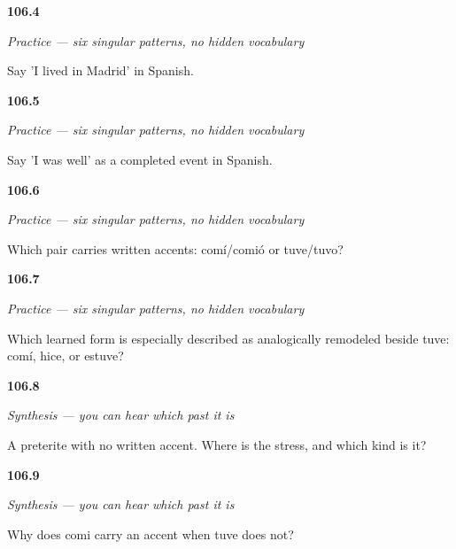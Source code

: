 \noindent\begin{minipage}[t]{\linewidth}
\raggedright
\hypertarget{review-ES-C15-practice-vivi-madrid}{\textbf{106.4}} \emph{Practice — six singular patterns, no hidden vocabulary}\par
\small Say 'I lived in Madrid' in Spanish.
\end{minipage}\par\medskip

\noindent\begin{minipage}[t]{\linewidth}
\raggedright
\hypertarget{review-ES-C15-practice-estuve-bien}{\textbf{106.5}} \emph{Practice — six singular patterns, no hidden vocabulary}\par
\small Say 'I was well' as a completed event in Spanish.
\end{minipage}\par\medskip

\noindent\begin{minipage}[t]{\linewidth}
\raggedright
\hypertarget{review-ES-C15-practice-accent-contrast}{\textbf{106.6}} \emph{Practice — six singular patterns, no hidden vocabulary}\par
\small Which pair carries written accents: comí/comió or tuve/tuvo?
\end{minipage}\par\medskip

\noindent\begin{minipage}[t]{\linewidth}
\raggedright
\hypertarget{review-ES-C15-practice-history-match}{\textbf{106.7}} \emph{Practice — six singular patterns, no hidden vocabulary}\par
\small Which learned form is especially described as analogically remodeled beside tuve: comí, hice, or estuve?
\end{minipage}\par\medskip

\noindent\begin{minipage}[t]{\linewidth}
\raggedright
\hypertarget{review-ES-C15-sintesis-preterito-stress}{\textbf{106.8}} \emph{Synthesis — you can hear which past it is}\par
\small A preterite with no written accent. Where is the stress, and which kind is it?
\end{minipage}\par\medskip

\noindent\begin{minipage}[t]{\linewidth}
\raggedright
\hypertarget{review-ES-C15-sintesis-preterito-accent}{\textbf{106.9}} \emph{Synthesis — you can hear which past it is}\par
\small Why does comi carry an accent when tuve does not?
\end{minipage}\par\medskip

